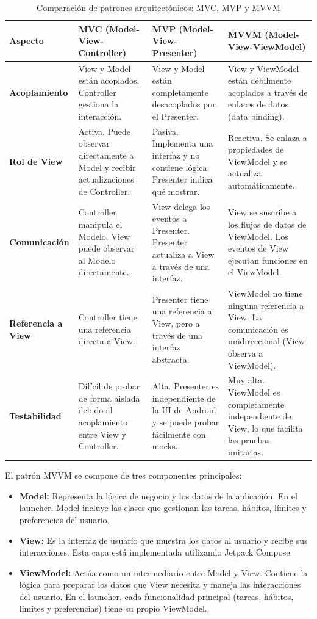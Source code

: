 \begin{table}[ht]
\centering
\caption{Comparación de patrones arquitectónicos: MVC, MVP y MVVM}
\label{tab:comparacion_arquitecturas}
\begin{tabular}{|p{}|p{}|p{}|p{}|}
\hline
\textbf{Aspecto} & \textbf{MVC (Model-View-Controller)} & \textbf{MVP (Model-View-Presenter)} & \textbf{MVVM (Model-View-ViewModel)} \\
\hline
\textbf{Acoplamiento} & View y Model están acoplados. Controller gestiona la interacción. & View y Model están completamente desacoplados por el Presenter. & View y ViewModel están débilmente acoplados a través de enlaces de datos (data binding). \\
\hline
\textbf{Rol de View} & Activa. Puede observar directamente a Model y recibir actualizaciones de Controller. & Pasiva. Implementa una interfaz y no contiene lógica. Presenter indica qué mostrar. & Reactiva. Se enlaza a propiedades de ViewModel y se actualiza automáticamente. \\
\hline
\textbf{Comunicación} & Controller manipula el Modelo. View puede observar al Modelo directamente. & View delega los eventos a Presenter. Presenter actualiza a View a través de una interfaz. & View se suscribe a los flujos de datos de ViewModel. Los eventos de View ejecutan funciones en el ViewModel. \\
\hline
\textbf{Referencia a View} & Controller tiene una referencia directa a View. & Presenter tiene una referencia a View, pero a través de una interfaz abstracta. & ViewModel no tiene ninguna referencia a View. La comunicación es unidireccional (View observa a ViewModel). \\
\hline
\textbf{Testabilidad} & Difícil de probar de forma aislada debido al acoplamiento entre View y Controller. & Alta. Presenter es independiente de la UI de Android y se puede probar fácilmente con mocks. & Muy alta. ViewModel es completamente independiente de View, lo que facilita las pruebas unitarias. \\
\hline
\end{tabular}
\end{table}

El patrón MVVM se compone de tres componentes principales:

\begin{itemize}
  \item \textbf{Model:} Representa la lógica de negocio y los datos de la aplicación. En el launcher, Model incluye las clases que gestionan las tareas, hábitos, límites y preferencias del usuario.

  \item \textbf{View:} Es la interfaz de usuario que muestra los datos al usuario y recibe sus interacciones. Esta capa está implementada utilizando Jetpack Compose.

  \item \textbf{ViewModel:} Actúa como un intermediario entre Model y View. Contiene la lógica para preparar los datos que View necesita y maneja las interacciones del usuario. En el launcher, cada funcionalidad principal (tareas, hábitos, limites y preferencias) tiene su propio ViewModel.
\end{itemize}

